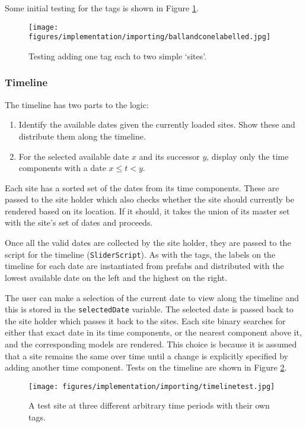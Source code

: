 \documentclass[12pt, a4paper]{article}
\begin{document}
Some initial testing for the tags is shown in Figure \ref{fig:ballconetag}.
\begin{figure}[H]
    \centering
    \texttt{[image: figures/implementation/importing/ballandconelabelled.jpg]}
        \caption{Testing adding one tag each to two simple `sites'.}
        \label{fig:ballconetag}
\end{figure}

\subsubsection{Timeline}
The timeline has two parts to the logic:
\begin{enumerate}
    \item Identify the available dates given the currently loaded sites. Show these and distribute them along the timeline.
    \item For the selected available date $x$ and its successor $y$, display only the time components with a date $x \leq t < y$.
\end{enumerate}

Each site has a sorted set of the dates from its time components. These are passed to the site holder which also checks whether the site should currently be rendered based on its location. If it should, it takes the union of its master set with the site's set of dates and proceeds.

Once all the valid dates are collected by the site holder, they are passed to the script for the timeline (\verb|SliderScript|). As with the tags, the labels on the timeline for each date are instantiated from prefabs and distributed with the lowest available date on the left and the highest on the right. 

The user can make a selection of the current date to view along the timeline and this is stored in the \verb|selectedDate| variable. The selected date is passed back to the site holder which passes it back to the sites. Each site binary searches for either that exact date in its time components, or the nearest component above it, and the corresponding models are rendered. This choice is because it is assumed that a site remains the same over time until a change is explicitly specified by adding another time component. Tests on the timeline are shown in Figure \ref{fig:timelinetest}.

\begin{figure}[h]
    \centering
    \texttt{[image: figures/implementation/importing/timelinetest.jpg]}
        \caption{A test site at three different arbitrary time periods with their own tags.}
        \label{fig:timelinetest}
\end{figure}
\end{document}
